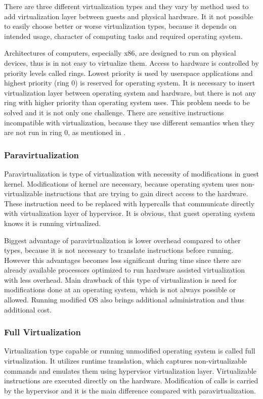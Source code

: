 
There are three different virtualization types and they vary by method used to add virtualization layer between guests and physical hardware. It it not possible to easily choose better or worse virtualization types, because it depends on intended usage, character of computing tasks and required operating system.
 
Architectures of computers, especially x86, are designed to run on physical devices, thus is in not easy to virtualize them. Access to hardware is controlled by priority levels called rings. Lowest priority is used by userspace applications and highest priority (ring 0) is reserved for operating system. It is necessary to insert virtualization layer between operating system and hardware, but there is not any ring with higher priority than operating system uses. This problem needs to be solved and it is not only one challenge. There are sensitive instructions incompatible with virtualization, because they use different semantics when they are not run in ring 0, as mentioned in \cite{vmware-para}.

\subsubsection{Paravirtualization}
Paravirtualization is type of virtualization with necessity of modifications in guest kernel. Modifications of kernel are necessary, because operating system uses non-virtualizable instructions that are trying to gain direct access to the hardware. These instruction need to be replaced with hypercalls that communicate directly with virtualization layer of hypervisor. \cite{vmware-para} It is obvious, that guest operating system knows it is running virtualized. 

Biggest advantage of paravirtualization is lower overhead compared to other types, because it is not necessary to translate instructions before running. However this advantages becomes less significant during time since there are already available processors optimized to run hardware assisted virtualization with less overhead. Main drawback of this type of virtualization is need for modifications done at an operating system, which is not always possible or allowed. Running modified \Ac{OS} also brings additional administration and thus additional cost.

\subsubsection{Full Virtualization}
Virtualization type capable or running unmodified operating system is called full virtualization. It utilizes runtime translation, which captures non-virtualizable commands and emulates them using hypervisor virtualization layer. Virtualizable instructions are executed directly on the hardware. Modification of  calls is carried by the hypervisor and it is the main difference compared with paravirtualization. 

